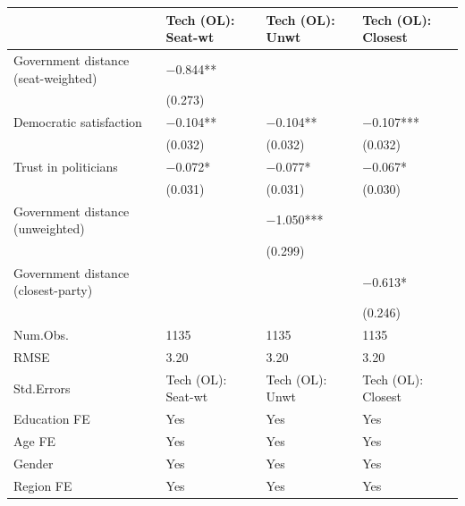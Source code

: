 \begin{tabular}{llll}
\hline
& Tech (OL): Seat-wt & Tech (OL): Unwt & Tech (OL): Closest \\ \hline
Government distance (seat-weighted) & \num{-0.844}** &  &  \\
& (\num{0.273}) &  &  \\
Democratic satisfaction & \num{-0.104}** & \num{-0.104}** & \num{-0.107}*** \\
& (\num{0.032}) & (\num{0.032}) & (\num{0.032}) \\
Trust in politicians & \num{-0.072}* & \num{-0.077}* & \num{-0.067}* \\
& (\num{0.031}) & (\num{0.031}) & (\num{0.030}) \\
Government distance (unweighted) &  & \num{-1.050}*** &  \\
&  & (\num{0.299}) &  \\
Government distance (closest-party) &  &  & \num{-0.613}* \\
&  &  & (\num{0.246}) \\
Num.Obs. & \num{1135} & \num{1135} & \num{1135} \\
RMSE & \num{3.20} & \num{3.20} & \num{3.20} \\
Std.Errors & Tech (OL): Seat-wt & Tech (OL): Unwt & Tech (OL): Closest \\
Education FE & Yes & Yes & Yes \\
Age FE & Yes & Yes & Yes \\
Gender & Yes & Yes & Yes \\
Region FE & Yes & Yes & Yes \\
\hline
\end{tabular}

